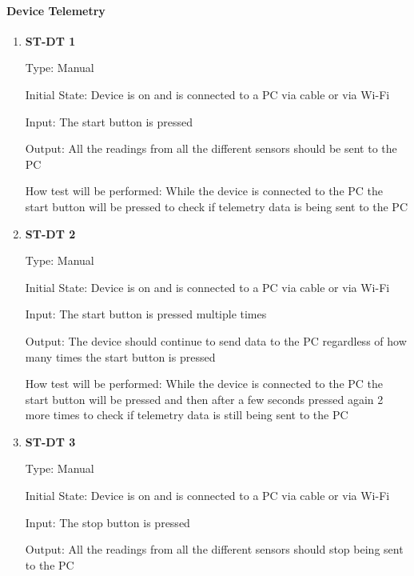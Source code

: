 \documentclass[12pt, titlepage]{article}
\begin{document}
\paragraph{Device Telemetry}	
\begin{enumerate}

  \item{\bf{ST-DT 1}}
  
  Type: Manual
            
  Initial State: Device is on and is connected to a PC via cable or via Wi-Fi
            
  Input: The start button is pressed
            
  Output: All the readings from all the different sensors should be sent to the PC
  
            
  How test will be performed: While the device is connected to the PC the start button will be pressed to check if telemetry data is being sent to the PC\\

  \item{\bf{ST-DT 2}}
  
  Type: Manual
            
  Initial State: Device is on and is connected to a PC via cable or via Wi-Fi
            
  Input: The start button is pressed multiple times
            
  Output: The device should continue to send data to the PC regardless of how many times the start button is pressed
  
            
  How test will be performed: While the device is connected to the PC the start button will be pressed and then after a few seconds pressed again 2 more times to check if telemetry data is still being sent to the PC\\

  \item{\bf{ST-DT 3}}
  
  Type: Manual
            
  Initial State: Device is on and is connected to a PC via cable or via Wi-Fi
            
  Input: The stop button is pressed
            
  Output: All the readings from all the different sensors should stop being sent to the PC
  

\end{enumerate}
\end{document}
